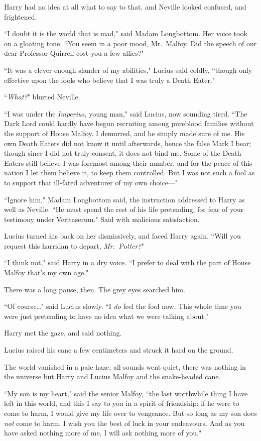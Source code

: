 Harry had no idea at all what to say to that, and Neville looked confused, and frightened.

``I doubt it is the world that is mad," said Madam Longbottom. Her voice took on a gloating tone. ``You seem in a poor mood, Mr.~Malfoy. Did the speech of our dear Professor Quirrell cost you a few allies?"

``It was a clever enough slander of my abilities," Lucius said coldly, ``though only effective upon the fools who believe that I was truly a Death Eater."

``\emph{What?}" blurted Neville.

``I was under the \emph{Imperius,} young man," said Lucius, now sounding tired. ``The Dark Lord could hardly have begun recruiting among pureblood families without the support of House Malfoy. I demurred, and he simply made sure of me. His own Death Eaters did not know it until afterwards, hence the false Mark I bear; though since I did not truly consent, it does not bind me. Some of the Death Eaters still believe I was foremost among their number, and for the peace of this nation I let them believe it, to keep them controlled. But I was not such a fool as to support that ill-fated adventurer of my own choice---"

``Ignore him," Madam Longbottom said, the instruction addressed to Harry as well as Neville. ``He must spend the rest of his life pretending, for fear of your testimony under Veritaserum." Said with malicious satisfaction.

Lucius turned his back on her dismissively, and faced Harry again. ``Will you request this harridan to depart, \emph{Mr.~Potter?}"

``I think not," said Harry in a dry voice. ``I prefer to deal with the part of House Malfoy that's my own age."

There was a long pause, then. The grey eyes searched him.

``Of course{\ldots}" said Lucius slowly. ``I \emph{do} feel the fool now. This whole time you were just pretending to have no idea what we were talking about."

Harry met the gaze, and said nothing.

Lucius raised his cane a few centimeters and struck it hard on the ground.

The world vanished in a pale haze, all sounds went quiet, there was nothing in the universe but Harry and Lucius Malfoy and the snake-headed cane.

``My son is my heart," said the senior Malfoy, ``the last worthwhile thing I have left in this world, and this I say to you in a spirit of friendship: if he were to come to harm, I would give my life over to vengeance. But so long as my son does \emph{not} come to harm, I wish you the best of luck in your endeavours. And as you have asked nothing more of me, I will ask nothing more of you."


